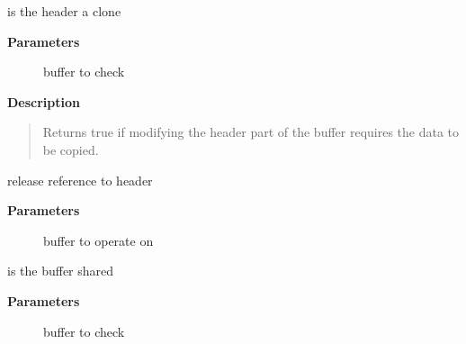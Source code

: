 \documentclass[a4paper,8pt,english]{sphinxmanual}
\begin{document}
\begin{fulllineitems}
\label{networking/kapi:c.skb_header_cloned}
is the header a clone

\end{fulllineitems}


\textbf{Parameters}
\begin{description}
\item[{}] \leavevmode
buffer to check

\end{description}

\textbf{Description}
\begin{quote}

Returns true if modifying the header part of the buffer requires
the data to be copied.
\end{quote}

\begin{fulllineitems}
\label{networking/kapi:c.__skb_header_release}
release reference to header

\end{fulllineitems}


\textbf{Parameters}
\begin{description}
\item[{}] \leavevmode
buffer to operate on

\end{description}

\begin{fulllineitems}
\label{networking/kapi:c.skb_shared}
is the buffer shared

\end{fulllineitems}


\textbf{Parameters}
\begin{description}
\item[{}] \leavevmode
buffer to check

\end{description}
\end{document}
